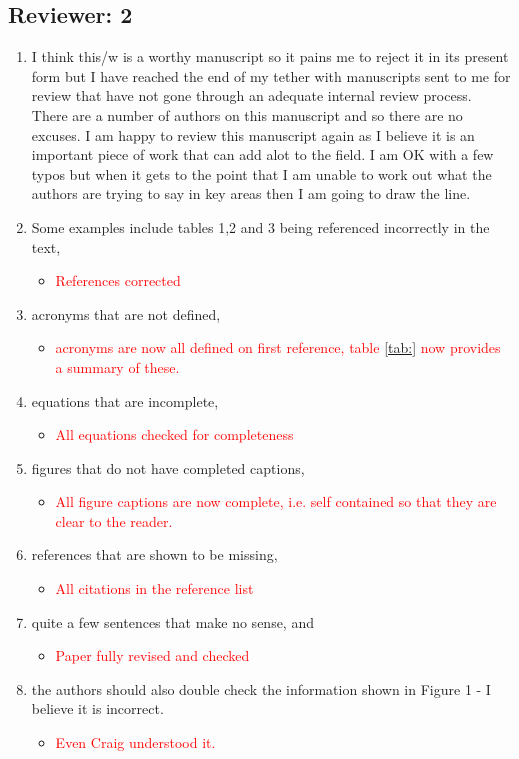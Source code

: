 \documentclass[a4paper,10pt]{article}
\newcommand{\red}{\textcolor{red}}
\begin{document}
\subsection*{Reviewer: 2}


\begin{enumerate}
 \item I think this/w is a worthy manuscript so it pains me to reject it in its present form but I have reached the end of my tether with manuscripts sent to me for review that have not gone through an adequate internal review process. There are a number of authors on this manuscript and so there are no excuses. I am happy to review this manuscript again as I believe it is an important piece of work that can add alot to the field. I am OK with a few typos but when it gets to the point that I am unable to work out what the authors are trying to say in key areas then I am going to draw the line. 
 
 \item  Some examples include tables 1,2 and 3 being referenced incorrectly in the text, 
  \begin{itemize}
    \item  \red{References corrected}
  \end{itemize}
 \item acronyms that are not defined, 
  \begin{itemize}
    \item \red{acronyms are now all defined on first reference, table \ref{tab:} now provides a summary of these.}
  \end{itemize}
 \item equations that are incomplete, 
  \begin{itemize}
    \item \red{All equations checked for completeness} 
  \end{itemize}
 \item figures that do not have completed captions, 
  \begin{itemize}
    \item \red{All figure captions are now complete, i.e. self contained so that they are clear to the reader.}
  \end{itemize}
 \item references that are shown to be missing, 
  \begin{itemize}
    \item  \red{All citations in the reference list}
  \end{itemize}
 \item quite a few sentences that make no sense, and 
  \begin{itemize}
    \item \red{Paper fully revised and checked} 
  \end{itemize}
 \item the authors should also double check the information shown in Figure 1 - I believe it is incorrect. 
  \begin{itemize}
    \item  \red{Even Craig understood it.}
  \end{itemize}
  \end{enumerate}
\newpage



%
\end{document}
